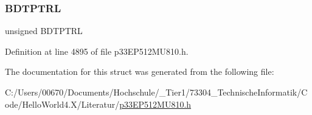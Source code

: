 \mbox{\label{structtag_u1_b_d_t_p1_b_i_t_s_a4938826201aaa21c8b228d5e369a4221}} 
\subsubsection{\texorpdfstring{B\+D\+T\+P\+T\+RL}{BDTPTRL}}
{\footnotesize\ttfamily unsigned B\+D\+T\+P\+T\+RL}



Definition at line 4895 of file p33\+E\+P512\+M\+U810.\+h.



The documentation for this struct was generated from the following file\+:\begin{DoxyCompactItemize}
\item 
C\+:/\+Users/00670/\+Documents/\+Hochschule/\+\_\+\+Tier1/73304\+\_\+\+Technische\+Informatik/\+Code/\+Hello\+World4.\+X/\+Literatur/\hyperlink{p33_e_p512_m_u810_8h}{p33\+E\+P512\+M\+U810.\+h}\end{DoxyCompactItemize}
